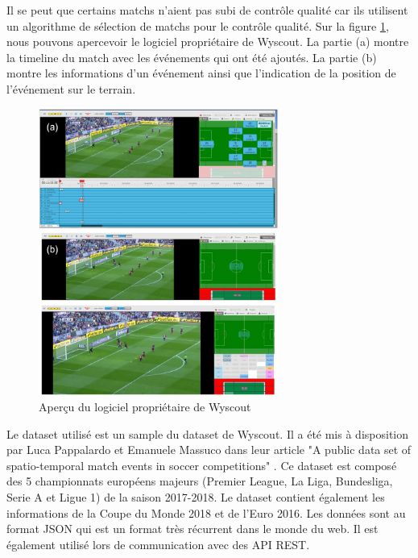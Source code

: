 \documentclass[12pt]{article}
\begin{document}
Il se peut que certains matchs n'aient pas subi de contrôle qualité car ils utilisent un algorithme de sélection de matchs pour le contrôle qualité.
Sur la figure \ref{fig:logiciel_proprietaire}, nous pouvons apercevoir le logiciel propriétaire de Wyscout.
La partie (a) montre la timeline du match avec les événements qui ont été ajoutés.
La partie (b) montre les informations d'un événement ainsi que l'indication de la position de l'événement sur le terrain.
\begin{figure}[htp]
    \centering
    \includegraphics[width=0.7\textwidth]{img/logiciel_proprietaire.png}
    \caption{Aperçu du logiciel propriétaire de Wyscout}
    \label{fig:logiciel_proprietaire}
\end{figure}
\newline\newline
Le dataset utilisé est un sample du dataset de Wyscout. 
Il a été mis à disposition par Luca Pappalardo et Emanuele Massuco dans leur article "A public data set of spatio-temporal match events in soccer competitions" \cite{pappalardoPublicDataSet2019}.
\newline
Ce dataset est composé des 5 championnats européens majeurs (Premier League, La Liga, Bundesliga, Serie A et Ligue 1) de la saison 2017-2018. 
Le dataset contient également les informations de la Coupe du Monde 2018 et de l'Euro 2016.
Les données sont au format JSON qui est un format très récurrent dans le monde du web. Il est également utilisé lors de communication avec des API REST.
\end{document}
